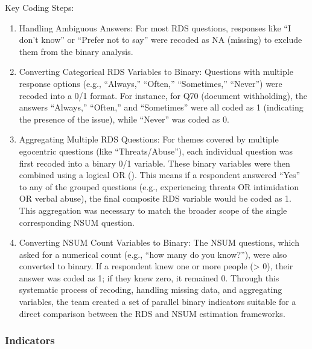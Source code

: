 \documentclass[
  12pt,
  letterpaper,
  DIV=11,
  numbers=noendperiod]{scrartcl}
\providecommand{\tightlist}{%
  \setlength{\itemsep}{0pt}\setlength{\parskip}{0pt}}
\theoremstyle{plain}
\theoremstyle{definition}
\begin{document}
Key Coding Steps:

\begin{enumerate}
\def\labelenumi{\arabic{enumi}.}
\tightlist
\item
  Handling Ambiguous Answers: For most RDS questions, responses like ``I
  don't know'' or ``Prefer not to say'' were recoded as NA (missing) to
  exclude them from the binary analysis.
\item
  Converting Categorical RDS Variables to Binary: Questions with
  multiple response options (e.g., ``Always,'' ``Often,'' ``Sometimes,''
  ``Never'') were recoded into a 0/1 format. For instance, for Q70
  (document withholding), the answers ``Always,'' ``Often,'' and
  ``Sometimes'' were all coded as 1 (indicating the presence of the
  issue), while ``Never'' was coded as 0.
\item
  Aggregating Multiple RDS Questions: For themes covered by multiple
  egocentric questions (like ``Threats/Abuse''), each individual
  question was first recoded into a binary 0/1 variable. These binary
  variables were then combined using a logical OR (\textbar). This means
  if a respondent answered ``Yes'' to any of the grouped questions
  (e.g., experiencing threats OR intimidation OR verbal abuse), the
  final composite RDS variable would be coded as 1. This aggregation was
  necessary to match the broader scope of the single corresponding NSUM
  question.
\item
  Converting NSUM Count Variables to Binary: The NSUM questions, which
  asked for a numerical count (e.g., ``how many do you know?''), were
  also converted to binary. If a respondent knew one or more people
  (\textgreater{} 0), their answer was coded as 1; if they knew zero, it
  remained 0. Through this systematic process of recoding, handling
  missing data, and aggregating variables, the team created a set of
  parallel binary indicators suitable for a direct comparison between
  the RDS and NSUM estimation frameworks.
\end{enumerate}

\subsubsection{Indicators}\label{indicators}
\end{document}
